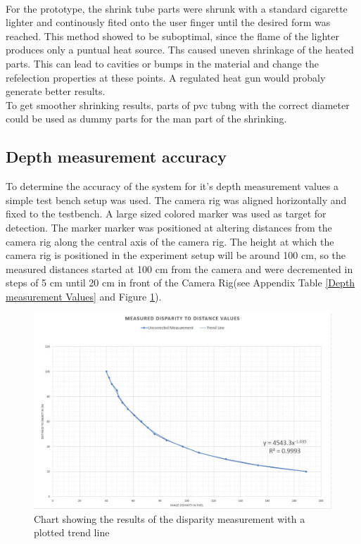 \\For the prototype, the shrink tube parts were shrunk with a standard cigarette lighter and continously fited onto the user finger until the desired form was reached. This method showed to  be suboptimal, since the flame of the lighter produces only a puntual heat source. Ths caused uneven shrinkage of the heated parts. This can lead to cavities or bumps in the material and change the refelection properties at these points. A regulated heat gun would probaly generate better results.
\\To get smoother shrinking results, parts of pvc tubng with the correct diameter could be used as dummy parts for the man part of the shrinking.



\newpage
\subsection{Depth measurement accuracy}
To determine the accuracy of the system for it's depth measurement values a simple test bench setup was used. The camera rig was aligned horizontally and fixed to the testbench. A large sized colored marker was used as target for detection. The marker marker was positioned at altering distances from the camera rig along the central axis of the camera rig. The height at which the camera rig is positioned in the experiment setup will be around 100 cm, so the measured distances started at 100 cm from the camera and were decremented in steps of 5 cm until 20 cm in front of the Camera Rig(see Appendix Table \ref{Depth measurement Values} and Figure \ref{char:DisparityToDistanceChart}).
\begin{figure}[H]
\includegraphics[width=\textwidth]{images/Disparity_to_distance.JPG}
\caption{Chart showing the results of the disparity measurement with a plotted trend line}
\label{char:DisparityToDistanceChart} 
\end{figure}
